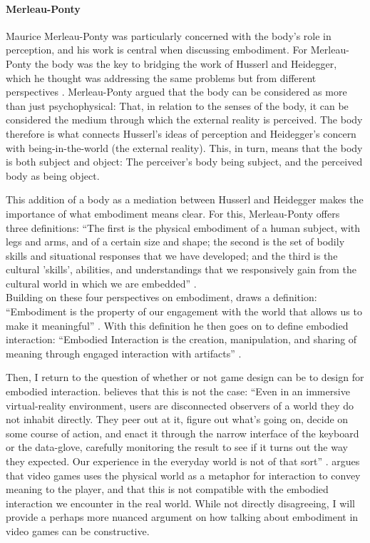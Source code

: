 \paragraph{Merleau-Ponty} Maurice Merleau-Ponty was particularly concerned with the body's role in perception, and his work is central when discussing embodiment. For Merleau-Ponty the body was the key to bridging the work of Husserl and Heidegger, which he thought was addressing the same problems but from different perspectives \cite{ponty}. Merleau-Ponty argued that the body can be considered as more than just psychophysical: That, in relation to the senses of the body, it can be considered the medium through which the external reality is perceived. The body therefore is what connects Husserl's ideas of perception and Heidegger's concern with being-in-the-world (the external reality). This, in turn, means that the body is both subject and object: The perceiver's body being subject, and the perceived body as being object.

This addition of a body as a mediation between Husserl and Heidegger makes the importance of what embodiment means clear. For this, Merleau-Ponty offers three definitions: ``The first is the physical embodiment of a human subject, with legs and arms, and of a certain size and shape; the second is the set of bodily skills and situational responses that we have developed; and the third is the cultural 'skills', abilities, and understandings that we responsively gain from the cultural world in which we are embedded'' \cite[p. 114]{dourish}.
\\
Building on these four perspectives on embodiment,  draws a definition: ``Embodiment is the property of our engagement with the world that allows us to make it meaningful'' \cite[p. 126]{dourish}. With this definition he then goes on to define embodied interaction: ``Embodied Interaction is the creation, manipulation, and sharing of meaning through engaged interaction with artifacts'' \cite[p. 126]{dourish}.

Then, I return to the question of whether or not game design can be to design for embodied interaction.  believes that this is not the case: ``Even in an immersive virtual-reality environment, users are disconnected observers of a world they do not inhabit directly. They peer out at it, figure out what’s going on, decide on some course of action, and enact it through the narrow interface of the keyboard or the data-glove, carefully monitoring the result to see if it turns out the way they expected. Our experience in the everyday world is not of that sort'' \cite[p. 102]{dourish}.  argues that video games uses the physical world as a metaphor for interaction to convey meaning to the player, and that this is not compatible with the embodied interaction we encounter in the real world. While not directly disagreeing, I will provide a perhaps more nuanced argument on how talking about embodiment in video games can be constructive.

